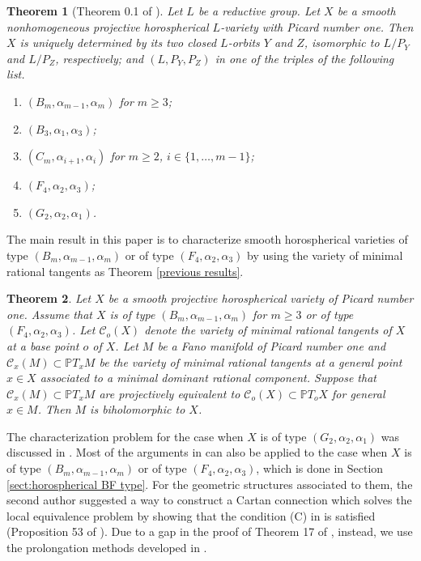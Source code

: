 \documentclass[12pt]{amsart}
\theoremstyle{plain}
\newtheorem{theorem} {Theorem} [section]
\theoremstyle{definition}
\def\Aut{\operatorname{Aut}}
\begin{document}
\begin{theorem}[Theorem 0.1  of \cite{Pa}]%
Let $L$ be a reductive group.
 Let $X$ be a smooth nonhomogeneous projective horospherical $L$-variety with Picard number one.
 Then $X$ is uniquely determined by its two closed $L$-orbits $ Y$ and $Z$, isomorphic to $L/P_Y$ and $L/P_Z$, respectively; and $(L, P_Y, P_Z)$ in one of the triples of the following list.
 \begin{enumerate}
   \item[\rm(1)] $(B_m,{\alpha_{m-1}},{\alpha_{m}})$ for $m\geq3$;
   \item[\rm(2)] $(B_3,{\alpha_{1}},{\alpha_{3}})$;
   \item[\rm(3)] $(C_m,{\alpha_{i+1}},{\alpha_{i}})$ for $m\geq2$, $i\in \{1,\ldots, m-1\}$;
   \item[\rm(4)] $(F_4,{\alpha_{2}},{\alpha_3})$;
   \item[\rm(5)] $(G_2,{\alpha_{2}},{\alpha_1})$.


 \end{enumerate}

\end{theorem}

The main result in this paper is to characterize smooth horospherical varieties of type $(B_m, \alpha_{m-1}, \alpha_m)$ or of type $(F_4, \alpha_2, \alpha_3)$ by using the variety of minimal rational tangents as Theorem \ref{previous results}.

\begin{theorem} \label{main results}
Let $X$ be a smooth projective horospherical variety of Picard number one. Assume that $X$ is of type $(B_m, \alpha_{m-1}, \alpha_m)$ for $m \geq 3$ or of type $(F_4, \alpha_2, \alpha_3)$.
Let $\mathcal C_o(X)$ denote the variety of minimal rational tangents of $X$ at a base point $o$ of $X$.
Let $M$ be a Fano manifold of Picard number one and $\mathcal C_x(M) \subset \mathbb PT_xM$ be the variety of minimal rational tangents at a general point $x \in X$ associated to a minimal dominant rational component. Suppose that $\mathcal C_x(M) \subset \mathbb PT_xM$ are projectively equivalent to $\mathcal C_o (X)\subset \mathbb PT_oX$ for general $x \in M$. Then $M$ is biholomorphic to $X$.
\end{theorem}

 The characterization problem for the case when $X$ is of type $(G_2, \alpha_2, \alpha_1)$ was discussed in \cite{Hw15}. Most of the arguments in \cite{Hw15}    can also be applied to the case when $X$ is of type $(B_m, \alpha_{m-1}, \alpha_m)$ or of type $(F_4, \alpha_2, \alpha_3)$, which is done in Section \ref{sect:horospherical BF type}.
%
 For the   geometric structures associated to them,
 the second author suggested a way to construct a Cartan connection  which solves   the local equivalence problem by showing that the condition (C) in \cite{Mo93} is satisfied
(Proposition 53 of \cite{Ki}).
Due to a gap in the proof of Theorem 17 of \cite{Ki}, instead,  we use the prolongation methods developed in \cite{HM}.
\end{document}
